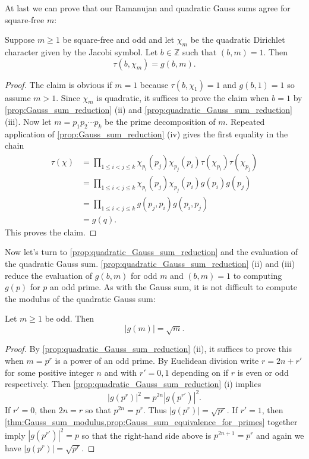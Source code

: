         At last we can prove that our Ramanujan and quadratic Gauss sums agree for square-free $m$:

        \begin{theorem}
          Suppose $m \ge 1$ be square-free and odd and let $\chi_{m}$ be the quadratic Dirichlet character given by the Jacobi symbol. Let $b \in \mathbb{Z}$ such that $(b,m) = 1$. Then
          \[
            \tau(b,\chi_{m}) = g(b,m).
          \]
        \end{theorem}
        \begin{proof}
          The claim is obvious if $m = 1$ because $\tau(b,\chi_{1}) = 1$ and $g(b,1) = 1$ so assume $m > 1$. Since $\chi_{m}$ is quadratic, it suffices to prove the claim when $b = 1$ by \cref{prop:Gauss_sum_reduction} (ii) and \cref{prop:quadratic_Gauss_sum_reduction} (iii). Now let $m = p_{1}p_{2} \cdots p_{k}$ be the prime decomposition of $m$. Repeated application of \cref{prop:Gauss_sum_reduction} (iv) gives the first equality in the chain
          \begin{align*}
            \tau(\chi) &= \prod_{1 \le i < j \le k}\chi_{p_{i}}(p_{j})\chi_{p_{j}}(p_{i})\tau(\chi_{p_{i}})\tau(\chi_{p_{j}}) \\
            &= \prod_{1 \le i < j \le k}\chi_{p_{i}}(p_{j})\chi_{p_{j}}(p_{i})g(p_{i})g(p_{j}) \\
            &= \prod_{1 \le i < j \le k}g(p_{j},p_{i})g(p_{i},p_{j}) \\
            &= g(q).
          \end{align*}
          This proves the claim.
        \end{proof}

        Now let's turn to \cref{prop:quadratic_Gauss_sum_reduction} and the evaluation of the quadratic Gauss sum. \cref{prop:quadratic_Gauss_sum_reduction} (ii) and (iii) reduce the evaluation of $g(b,m)$ for odd $m$ and $(b,m) = 1$ to computing $g(p)$ for $p$ an odd prime. As with the Gauss sum, it is not difficult to compute the modulus of the quadratic Gauss sum:

        \begin{theorem}\label{thm:quadratic_Gauss_sum_modulus}
          Let $m \ge 1$ be odd. Then
          \[
            |g(m)| = \sqrt{m}.
          \]
        \end{theorem}
        \begin{proof}
          By \cref{prop:quadratic_Gauss_sum_reduction} (ii), it suffices to prove this when $m = p^{r}$ is a power of an odd prime. By Euclidean division write $r = 2n+r'$ for some positive integer $n$ and with $r' = 0,1$ depending on if $r$ is even or odd respectively. Then \cref{prop:quadratic_Gauss_sum_reduction} (i) implies
          \[
            |g(p^{r})|^{2} = p^{2n}|g(p^{r'})|^{2}.
          \]
          If $r' = 0$, then $2n = r$ so that $p^{2n} = p^{r}$. Thus $|g(p^{r})| = \sqrt{p^{r}}$. If $r' = 1$, then \cref{thm:Gauss_sum_modulus,prop:Gauss_sum_equivalence_for_primes} together imply $|g(p^{r'})|^{2} = p$ so that the right-hand side above is $p^{2n+1} = p^{r}$ and again we have $|g(p^{r})| = \sqrt{p^{r}}$.
        \end{proof}

